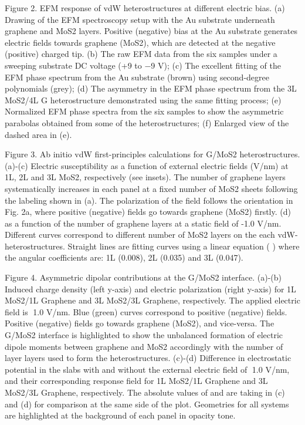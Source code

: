 Figure 2. EFM response of vdW heterostructures at different electric bias. (a) Drawing of the EFM spectroscopy setup with the Au substrate underneath graphene and MoS2 layers. Positive (negative) bias at the Au substrate generates electric fields towards graphene (MoS2), which are detected at the negative (positive) charged tip. (b) The raw EFM data from the six samples under a sweeping substrate DC voltage (+9 to −9 V); (c) The excellent fitting of the EFM phase spectrum from the Au substrate (brown) using second-degree polynomials (grey); (d) The asymmetry in the EFM phase spectrum from the 3L MoS2/4L G heterostructure demonstrated using the same fitting process; (e) Normalized EFM phase spectra from the six samples to show the asymmetric parabolas obtained from some of the heterostructures; (f) Enlarged view of the dashed area in (e).
 
Figure 3. Ab initio vdW first-principles calculations for G/MoS2 heterostructures. (a)-(c) Electric susceptibility   as a function of external electric fields (V/nm) at 1L, 2L and 3L MoS2, respectively (see insets). The number of graphene layers systematically increases in each panel at a fixed number of MoS2 sheets following the labeling shown in (a). The polarization of the field follows the orientation in Fig. 2a, where positive (negative) fields go towards graphene (MoS2) firstly.  (d)   as a function of the number of graphene layers at a static field of -1.0 V/nm. Different curves correspond to different number of MoS2 layers on the each vdW-heterostructures. Straight lines are fitting curves using a linear equation ( ) where the angular coefficients   are: 1L (0.008), 2L (0.035) and 3L (0.047).  
 
Figure 4. Asymmetric dipolar contributions at the G/MoS2 interface. (a)-(b) Induced charge density   (left y-axis) and electric polarization   (right y-axis) for 1L MoS2/1L Graphene and 3L MoS2/3L Graphene, respectively. The applied electric field is 1.0 V/nm. Blue (green) curves correspond to positive (negative) fields. Positive (negative) fields go towards graphene (MoS2), and vice-versa. The G/MoS2 interface is highlighted to show the unbalanced formation of electric dipole moments between graphene and MoS2 accordingly with the number of layer layers used to form the heterostructures. (c)-(d) Difference in electrostatic potential  in the slabs with and without the external electric field of 1.0 V/nm, and their corresponding response field  for 1L MoS2/1L Graphene and 3L MoS2/3L Graphene, respectively. The absolute values of   and   are taking in (c) and (d) for comparison at the same side of the plot. Geometries for all systems are highlighted at the background of each panel in opacity tone.  
 
